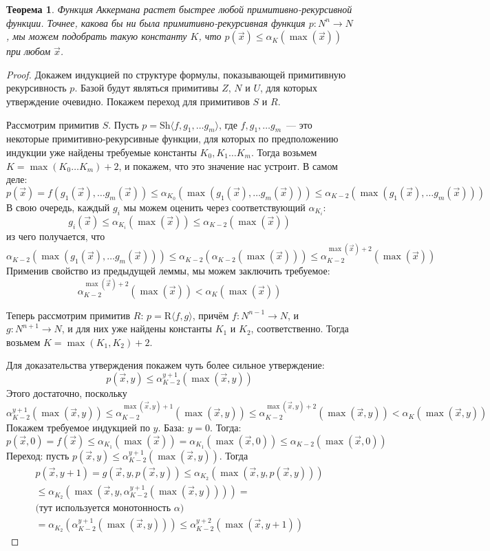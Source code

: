 \documentclass[a4paper,11pt]{article}
\newtheorem{thm}{Теорема}[section]
\theoremstyle{definition}
\newcommand{\vect}[1]{\overrightarrow{#1}}
\newcommand{\Sh}[1]{\mathrm{Sh}\langle #1\rangle}
\newcommand{\Rr}[1]{\mathrm{R}\langle #1\rangle}
\begin{document}
\begin{thm}\label{thm:ack-grows}
Функция Аккермана растет быстрее любой примитивно-рекурсивной функции. Точнее,
какова бы ни была примитивно-рекурсивная функция $p : N^n \to N$, мы можем
подобрать такую константу $K$, что $p(\vect{x}) \le \alpha_K(\max(\vect{x}))$
при любом $\vect{x}$.
\end{thm}
\begin{proof}
Докажем индукцией по структуре формулы, показывающей примитивную рекурсивность
$p$. Базой будут являться примитивы $Z$, $N$ и $U$, для которых утверждение
очевидно. Покажем переход для примитивов $S$ и $R$.

Рассмотрим примитив $S$. Пусть $p = \Sh{f, g_1, \dots g_m}$, где $f, g_1, \dots
g_m$~--- это некоторые примитивно-рекурсивные функции, для которых по
предположению индукции уже найдены требуемые константы $K_0, K_1 \dots K_m$.
Тогда возьмем $K = \max(K_0 \dots K_m) + 2$, и покажем, что это значение нас
устроит. В самом деле:
\[
p(\vect{x}) = f(g_1(\vect{x}), \dots g_m(\vect{x}))
\le \alpha_{K_0}(\max(g_1(\vect{x}), \dots g_m(\vect{x})))
\le \alpha_{K-2}(\max(g_1(\vect{x}), \dots g_m(\vect{x})))
\]
В свою очередь, каждый $g_i$ мы можем оценить через соответствующий
$\alpha_{K_i}$:
\[
g_i(\vect{x}) \le \alpha_{K_i}(\max(\vect{x})) \le \alpha_{K-2}(\max(\vect{x}))
\]
из чего получается, что
\[
\alpha_{K-2}(\max(g_1(\vect{x}), \dots g_m(\vect{x})))
\le \alpha_{K-2}(\alpha_{K-2}(\max(\vect{x})))
\le \alpha_{K-2}^{\max(\vect{x})+2}(\max(\vect{x}))
\]
Применив свойство из предыдущей леммы, мы можем заключить требуемое:
\[
\alpha_{K-2}^{\max(\vect{x})+2}(\max(\vect{x})) < \alpha_K(\max(\vect{x}))
\]

Теперь рассмотрим примитив $R$: $p = \Rr{f, g}$, причём $f : N^{n-1} \to N$, и
$g : N^{n+1} \to N$, и для них уже найдены константы $K_1$ и $K_2$,
соответственно. Тогда возьмем $K = \max(K_1, K_2) + 2$.

Для доказательства утверждения покажем чуть более сильное утверждение:
\[
p(\vect{x}, y) \le \alpha_{K-2}^{y+1}(\max(\vect{x}, y))
\]
Этого достаточно, поскольку
\[
\alpha_{K-2}^{y+1}(\max(\vect{x}, y)) \le \alpha_{K-2}^{\max(\vect{x},y)+1}(\max(\vect{x}, y)) \le
\alpha_{K-2}^{\max(\vect{x},y)+2}(\max(\vect{x}, y)) < \alpha_K(\max(\vect{x}, y))
\]
Покажем требуемое индукцией по $y$. База: $y = 0$. Тогда:
\[
p(\vect{x}, 0) = f(\vect{x}) \le \alpha_{K_1}(\max(\vect{x})) = \alpha_{K_1}(\max(\vect{x}, 0))
\le \alpha_{K-2}(\max(\vect{x}, 0))
\]
Переход: пусть $p(\vect{x}, y) \le \alpha_{K-2}^{y+1}(\max(\vect{x}, y))$. Тогда
\begin{multline*}
p(\vect{x}, y+1) = g(\vect{x}, y, p(\vect{x}, y))
\le \alpha_{K_2}(\max(\vect{x}, y, p(\vect{x}, y)))\\
\le \alpha_{K_2}(\max(\vect{x}, y, \alpha_{K-2}^{y+1}(\max(\vect{x}, y)))) =\\
\text{(тут используется монотонность } \alpha) \\
= \alpha_{K_2}(\alpha_{K-2}^{y+1}(\max(\vect{x}, y)))
\le \alpha_{K-2}^{y+2}(\max(\vect{x}, y+1))
\end{multline*}
\end{proof}
\end{document}
